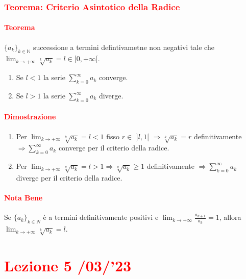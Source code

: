 \documentclass{article}
\newcommand{\N}{\mathbb{N}}
\begin{document}
\subsubsection{\textcolor{red}{Teorema: Criterio Asintotico della Radice}}
\paragraph{\textcolor{red}{Teorema}}
$\{a_k\}_{k \in \N}$ successione a termini defintivametne non negativi tale che $\lim_{k \rightarrow +\infty} \sqrt[k]{a_k} = l \in [0,+\infty[$.
\begin{enumerate}
    \item Se $l<1$ la serie $ \sum_{k=0}^{\infty} a_k$ converge.
    \item Se $l> 1$ la serie $\sum_{k=0}^{\infty} a_k$ diverge.
\end{enumerate}

\paragraph{\textcolor{red}{Dimostrazione}}
\begin{enumerate}
    \item Per $\lim_{k \rightarrow +\infty} \sqrt[k]{a_k} = l < 1$ fisso $r\in \,\,]l,1[\,\, \Rightarrow \sqrt[k]{a_k} =r$  definitivamente $\Rightarrow \sum_{k=0}^{\infty} a_k$ converge per il criterio della radice.
    \item Per $\lim_{k \rightarrow +\infty} \sqrt[k]{a_k} = l > 1 \Rightarrow \sqrt[k]{a_k}\geq 1$ definitivamente  $\Rightarrow \sum_{k=0}^{\infty} a_k$ diverge per il criterio della radice.
\end{enumerate}
\begin{flushright}
\large\Lightning
\end{flushright}

\paragraph{\textcolor{red}{Nota Bene}}
Se $\{a_k\}_{k \in N}$ è a termini definitivamente positivi e  $\lim_{k \rightarrow +\infty} \frac{a_{k+1}}{a_k}=1$, allora $\lim_{k \rightarrow +\infty} \sqrt[k]{a_k}=l$.

\newpage
\section{\textcolor{red}{Lezione 5 \space{}/03/'23}}
\end{document}
